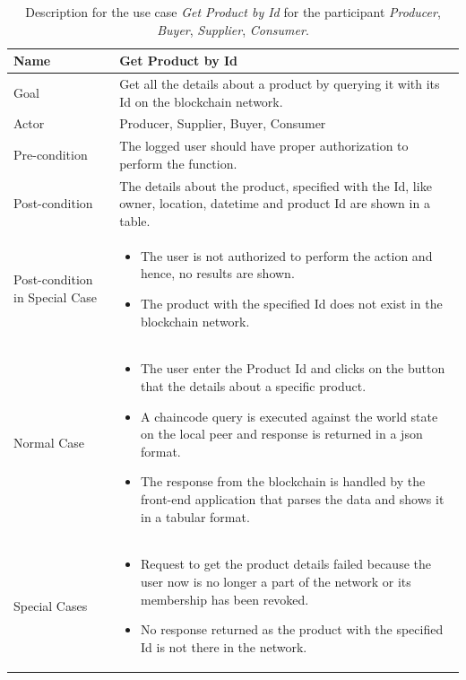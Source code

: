\documentclass[
  a4paper,  %
  twoside,  %
  bibliography=totoc,
  headsepline,
  cleardoublepage=empty,
  parskip=half,
  draft=false
]{scrbook}
\begin{document}
\begin{table}[t!]
\begin{center}
    \begin{tabular}{ | l | p{9cm} |}
    \hline
    \textbf{Name} & \textbf{Get Product by Id} \\ \hline
    Goal & Get all the details about a product by querying it with its Id on the blockchain network. \\ \hline
    Actor & Producer, Supplier, Buyer, Consumer \\ \hline
    Pre-condition & The logged user should have proper authorization to perform the function. \\ \hline
    Post-condition & The details about the product, specified with the Id, like owner, location, datetime and product Id are shown in a table. \\ \hline
    Post-condition in Special Case & \begin{itemize}
        \item The user is not authorized to perform the action and hence, no results are shown.
        \item The product with the specified Id does not exist in the blockchain network.
    \end{itemize}\\ \hline
    Normal Case & \begin{itemize}
        \item The user enter the Product Id and clicks on the button that the details about a specific product.
        \item A chaincode query is executed against the world state on the local peer and response is returned in a json format.
        \item The response from the blockchain is handled by the front-end application that parses the data and shows it in a tabular format.
    \end{itemize}\\ \hline
    Special Cases & \begin{itemize}
        \item Request to get the product details failed because the user now is no longer a part of the network or its membership has been revoked.
        \item No response returned as the product with the specified Id is not there in the network.
    \end{itemize} \\ \hline
    \end{tabular}
\end{center}
\caption{Description for the use case \textit{Get Product by Id} for the participant \textit{Producer}, \textit{Buyer}, \textit{Supplier}, \textit{Consumer}.}
    \label{tab:uc2}
\end{table}
\end{document}

